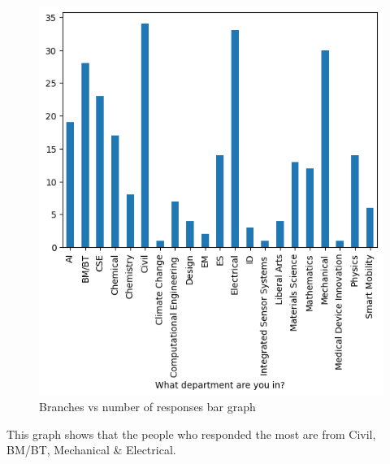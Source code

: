 \documentclass{article}
\begin{document}
\begin{figure}[H]
    \centering
    \includegraphics[scale = 0.6]{bar_department.png}
    \caption{Branches vs number of responses bar graph}  
    \label{fig:Normality_plot}
\end{figure}
This graph shows that the people who responded the most are from Civil, BM/BT, Mechanical \& Electrical.
\end{document}
